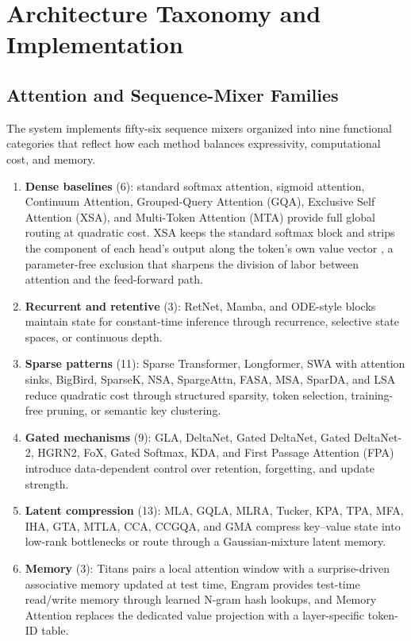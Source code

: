 \section{Architecture Taxonomy and Implementation}
\label{sec:architecture-taxonomy}

\subsection{Attention and Sequence-Mixer Families}
\label{sec:attention-families}

The system implements fifty-six sequence mixers organized into nine functional categories that reflect how each method balances expressivity, computational cost, and memory.
\begin{enumerate}[leftmargin=*]
    \item \textbf{Dense baselines} (6): standard softmax attention, sigmoid attention, Continuum Attention, Grouped-Query Attention (GQA), Exclusive Self Attention (XSA), and Multi-Token Attention (MTA) provide full global routing at quadratic cost. XSA keeps the standard softmax block and strips the component of each head's output along the token's own value vector \citep{zhai_exclusive_2026}, a parameter-free exclusion that sharpens the division of labor between attention and the feed-forward path.
    \item \textbf{Recurrent and retentive} (3): RetNet, Mamba, and ODE-style blocks maintain state for constant-time inference through recurrence, selective state spaces, or continuous depth.
    \item \textbf{Sparse patterns} (11): Sparse Transformer, Longformer, SWA with attention sinks, BigBird, SparseK, NSA, SpargeAttn, FASA, MSA, SparDA, and LSA reduce quadratic cost through structured sparsity, token selection, training-free pruning, or semantic key clustering.
    \item \textbf{Gated mechanisms} (9): GLA, DeltaNet, Gated DeltaNet, Gated DeltaNet-2, HGRN2, FoX, Gated Softmax, KDA, and First Passage Attention (FPA) introduce data-dependent control over retention, forgetting, and update strength.
    \item \textbf{Latent compression} (13): MLA, GQLA, MLRA, Tucker, KPA, TPA, MFA, IHA, GTA, MTLA, CCA, CCGQA, and GMA compress key--value state into low-rank bottlenecks or route through a Gaussian-mixture latent memory.
    \item \textbf{Memory} (3): Titans pairs a local attention window with a surprise-driven associative memory updated at test time, Engram provides test-time read/write memory through learned N-gram hash lookups, and Memory Attention replaces the dedicated value projection with a layer-specific token-ID table.

\end{enumerate}
